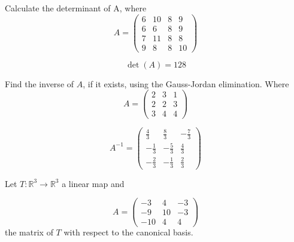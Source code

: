 \begin{questions}

\question Calculate the determinant of A, where
$$
A=\left(\begin{array}{rrrr}
6 & 10 & 8 & 9 \\
6 & 6 & 8 & 9 \\
7 & 11 & 8 & 8 \\
9 & 8 & 8 & 10
\end{array}\right)
$$

\begin{solution}
$$\det(A)=128$$
\end{solution}

\question Find the inverse of $A$, if it exists, using the Gauss-Jordan elimination. Where
$$
A=\left(\begin{array}{rrr}
2 & 3 & 1 \\
2 & 2 & 3 \\
3 & 4 & 4
\end{array}\right)
$$

\begin{solution}
$$A^{-1}=\left(\begin{array}{rrr}
\frac{4}{3} & \frac{8}{3} & -\frac{7}{3} \\
-\frac{1}{3} & -\frac{5}{3} & \frac{4}{3} \\
-\frac{2}{3} & -\frac{1}{3} & \frac{2}{3}
\end{array}\right)$$
\end{solution}

\question Let $T:\mathbb{R}^3\rightarrow\mathbb{R}^3$  a linear map and
 
$$
A=\left(\begin{array}{rrr}
-3 & 4 & -3 \\
-9 & 10 & -3 \\
-10 & 4 & 4
\end{array}\right)
$$
the matrix of $T$ with respect to the canonical basis.
\end{questions}
